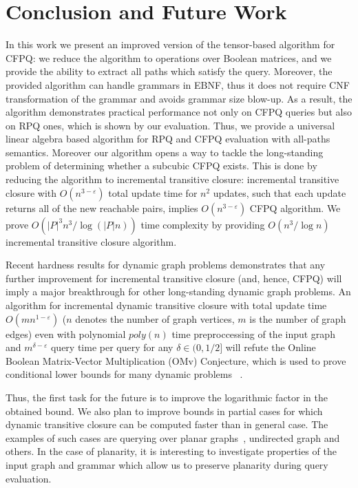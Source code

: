 \section{Conclusion and Future Work}

In this work we present an improved version of the tensor-based algorithm for CFPQ: we reduce the algorithm to operations over Boolean matrices, and we provide the ability to extract all paths which satisfy the query.
Moreover, the provided algorithm can handle grammars in EBNF, thus it does not require CNF transformation of the grammar and avoids grammar size blow-up.
As a result, the algorithm demonstrates practical performance not only on CFPQ queries but also on RPQ ones, which is shown by our evaluation.
Thus, we provide a universal linear algebra based algorithm for RPQ and CFPQ evaluation with all-paths semantics.
Moreover our algorithm opens a way to tackle the long-standing problem of determining whether a subcubic CFPQ exists.
This is done by reducing the algorithm to incremental transitive closure: incremental transitive closure with $O(n^{3-\varepsilon})$ total update time for $n^2$ updates, such that each update returns all of the new reachable pairs, implies $O(n^{3-\varepsilon})$ CFPQ algorithm.
We prove $O({|P|}^3n^3/\log (|P|n))$ time complexity by providing $O(n^3/\log{n})$ incremental transitive closure algorithm.


Recent hardness results for dynamic graph problems demonstrates that any further improvement for incremental transitive closure (and, hence, CFPQ) will imply a major breakthrough for other long-standing dynamic graph problems. An algorithm for incremental dynamic transitive closure with total update time $O(mn^{1-\varepsilon})$ ($n$ denotes the number of graph vertices, $m$ is the number of graph edges) even with polynomial $poly(n)$ time preproccessing of the input graph and $m^{\delta - \varepsilon}$ query time per query for any $\delta \in (0, 1/2]$ will refute the Online Boolean Matrix-Vector Multiplication (OMv) Conjecture, which is used to prove conditional lower bounds for many dynamic problems ~\citep{8948597, 10.1145/2746539.2746609}.


Thus, the first task for the future is to improve the logarithmic factor in the obtained bound.
We also plan to improve bounds in partial cases for which dynamic transitive closure can be computed faster than in general case.
The examples of such cases are querying over planar graphs~\citep{10.1007/3-540-57273-2_72}, undirected graph and others.
In the case of planarity, it is interesting to investigate properties of the input graph and grammar which allow us to preserve planarity during query evaluation.

